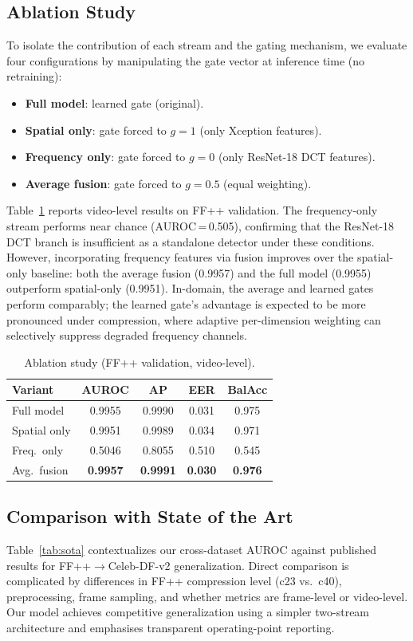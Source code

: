 \documentclass[conference]{IEEEtran}
\begin{document}
\subsection{Ablation Study}
To isolate the contribution of each stream and the gating mechanism, we evaluate four configurations by manipulating the gate vector at inference time (no retraining):
\begin{itemize}
  \item \textbf{Full model}: learned gate (original).
  \item \textbf{Spatial only}: gate forced to $g{=}1$ (only Xception features).
  \item \textbf{Frequency only}: gate forced to $g{=}0$ (only ResNet-18 DCT features).
  \item \textbf{Average fusion}: gate forced to $g{=}0.5$ (equal weighting).
\end{itemize}

Table~\ref{tab:ablation} reports video-level results on FF++ validation.
The frequency-only stream performs near chance (AUROC\,=\,0.505), confirming that the ResNet-18 DCT branch is insufficient as a standalone detector under these conditions.
However, incorporating frequency features via fusion improves over the spatial-only baseline: both the average fusion (0.9957) and the full model (0.9955) outperform spatial-only (0.9951).
In-domain, the average and learned gates perform comparably; the learned gate's advantage is expected to be more pronounced under compression, where adaptive per-dimension weighting can selectively suppress degraded frequency channels.

\begin{table}[t]
\centering
\caption{Ablation study (FF++ validation, video-level).}
\label{tab:ablation}
\begin{tabular}{lcccc}
\toprule
\textbf{Variant} & \textbf{AUROC} & \textbf{AP} & \textbf{EER} & \textbf{BalAcc} \\
\midrule
Full model    & 0.9955 & 0.9990 & 0.031 & 0.975 \\
Spatial only  & 0.9951 & 0.9989 & 0.034 & 0.971 \\
Freq.\ only   & 0.5046 & 0.8055 & 0.510 & 0.545 \\
Avg.\ fusion  & \textbf{0.9957} & \textbf{0.9991} & \textbf{0.030} & \textbf{0.976} \\
\bottomrule
\end{tabular}
\end{table}


\subsection{Comparison with State of the Art}
Table~\ref{tab:sota} contextualizes our cross-dataset AUROC against published results for FF++$\to$Celeb-DF-v2 generalization.
Direct comparison is complicated by differences in FF++ compression level (c23 vs.\ c40), preprocessing, frame sampling, and whether metrics are frame-level or video-level.
Our model achieves competitive generalization using a simpler two-stream architecture and emphasises transparent operating-point reporting.
\end{document}
